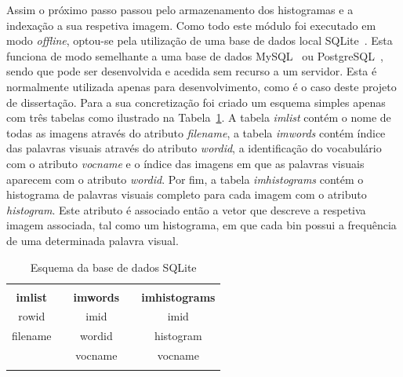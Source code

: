 Assim o próximo passo passou pelo armazenamento dos histogramas e a indexação a sua respetiva imagem. Como todo este módulo foi executado em modo \textit{offline}, optou-se pela utilização de uma base de dados local SQLite~\cite{sqlite}. Esta funciona de modo semelhante a uma base de dados MySQL~\cite{mysql} ou PostgreSQL~\cite{postgresql}, sendo que pode ser desenvolvida e acedida sem recurso a um servidor. Esta é normalmente utilizada apenas para desenvolvimento, como é o caso deste projeto de dissertação. Para a sua concretização foi criado um esquema simples apenas com três tabelas como ilustrado na Tabela~\ref{tab:schemadb}. A tabela \textit{imlist} contém o nome de todas as imagens através do atributo \textit{filename}, a tabela \textit{imwords} contém índice das palavras visuais através do atributo \textit{wordid}, a identificação do vocabulário com o atributo \textit{vocname} e o índice das imagens em que as palavras visuais aparecem com o atributo \textit{wordid}. Por fim, a tabela \textit{imhistograms} contém o histograma de palavras visuais completo para cada imagem com o atributo \textit{histogram}. Este atributo é associado então a vetor que descreve a respetiva imagem associada, tal como um histograma, em que cada bin possui a frequência de uma determinada palavra visual. 

\begin{table}[h]
\centering
\begin{tabular}{lcccc}
\multicolumn{5}{l}{} \\ \cline{1-1} \cline{3-3} \cline{5-5} 
\multicolumn{1}{|c|}{\cellcolor[HTML]{C0C0C0}\textbf{imlist}} & \multicolumn{1}{c|}{} & \multicolumn{1}{c|}{\cellcolor[HTML]{C0C0C0}\textbf{imwords}} & \multicolumn{1}{c|}{} & \multicolumn{1}{c|}{\cellcolor[HTML]{C0C0C0}\textbf{imhistograms}} \\ \cline{1-1} \cline{3-3} \cline{5-5} 
\multicolumn{1}{|c|}{rowid} & \multicolumn{1}{c|}{} & \multicolumn{1}{c|}{imid} & \multicolumn{1}{c|}{} & \multicolumn{1}{c|}{imid} \\ \cline{1-1} \cline{3-3} \cline{5-5} 
\multicolumn{1}{|c|}{filename} & \multicolumn{1}{c|}{\multirow{-3}{*}{}} & \multicolumn{1}{c|}{wordid} & \multicolumn{1}{c|}{} & \multicolumn{1}{c|}{histogram} \\ \cline{1-1} \cline{3-3} \cline{5-5} 
 & \multicolumn{1}{l|}{} & \multicolumn{1}{c|}{vocname} & \multicolumn{1}{c|}{\multirow{-4}{*}{}} & \multicolumn{1}{c|}{vocname} \\ \cline{3-3} \cline{5-5} 
\multicolumn{5}{l}{}
\end{tabular}
\caption{Esquema da base de dados SQLite}
\label{tab:schemadb}
\end{table}

